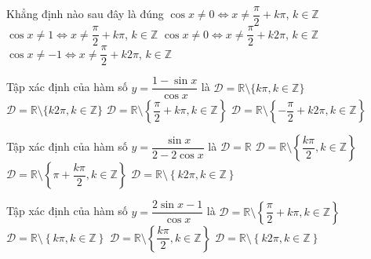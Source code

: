 \begin{ex}%
	Khẳng định nào sau đây là  đúng
	\choice 
		 {\True $\cos x\ne 0\Leftrightarrow x\ne \dfrac{\pi}{2}+k\pi$, $k\in \mathbb{Z}$}
		{$\cos x\ne 1\Leftrightarrow x\ne \dfrac{\pi}{2}+k\pi$, $k\in  \mathbb{Z}$}
		{$\cos x\ne 0\Leftrightarrow x\ne \dfrac{\pi}{2}+k2\pi$, $k\in  \mathbb{Z}$}
		{$\cos x\ne-1\Leftrightarrow  x\ne \dfrac{\pi}{2}+k2\pi$, $k\in \mathbb{Z}$}
\end{ex}

\begin{ex}%
	Tập xác định  của hàm số $y=\dfrac{1-\sin x}{\cos x}$ là
	\choice 
		{$\mathscr{D}=\mathbb{R}\setminus\{k\pi ,k\in\mathbb{Z}\}$} 
		{$\mathscr{D}=\mathbb{R}\setminus\{k2\pi ,k\in\mathbb{Z}\}$} 
		{\True  $\mathscr{D}=\mathbb{R}\setminus\left\{\dfrac{\pi}{2}+k\pi ,k\in\mathbb{Z}\right\}$}
		 {$\mathscr{D}=\mathbb{R}\setminus\left\{-\dfrac{\pi}{2}+k2\pi ,k\in\mathbb{Z}\right\}$}
\end{ex}

\begin{ex}%
	Tập xác định của hàm số  $y=\dfrac{\sin x}{2-2\cos x}$ là
	 \choice
		{$\mathscr{D}=\mathbb{R}$} 
		{$\mathscr{D}=\mathbb{R}\setminus\left\{\dfrac{k\pi}{2} ,k\in\mathbb{Z}\right\}$} 
		 {$\mathscr{D}=\mathbb{R}\setminus\left\{\pi +\dfrac{k\pi}{2} ,k\in\mathbb{Z}\right\}$}
		{\True  $\mathscr{D}=\mathbb{R}\setminus\left\{k2\pi ,k\in\mathbb{Z}\right\}$}
\end{ex}

\begin{ex}%
	Tập xác định của hàm số $y=\dfrac{2\sin  x-1}{\cos x}$ là
	 \choice
		{\True $\mathscr{D}=\mathbb{R}\setminus\left\{  \dfrac{\pi}{2}+k\pi ,k\in\mathbb{Z}\right\}$}
		{$\mathscr{D}=\mathbb{R}\setminus\left\{ k\pi ,k\in\mathbb{Z}\right\}$} 
		{$\mathscr{D}=\mathbb{R}\setminus\left\{ \dfrac{k\pi}{2}  ,k\in\mathbb{Z}\right\}$}
		 {$\mathscr{D}=\mathbb{R}\setminus\left\{ k2\pi ,k\in\mathbb{Z}\right\}$}
\end{ex}

